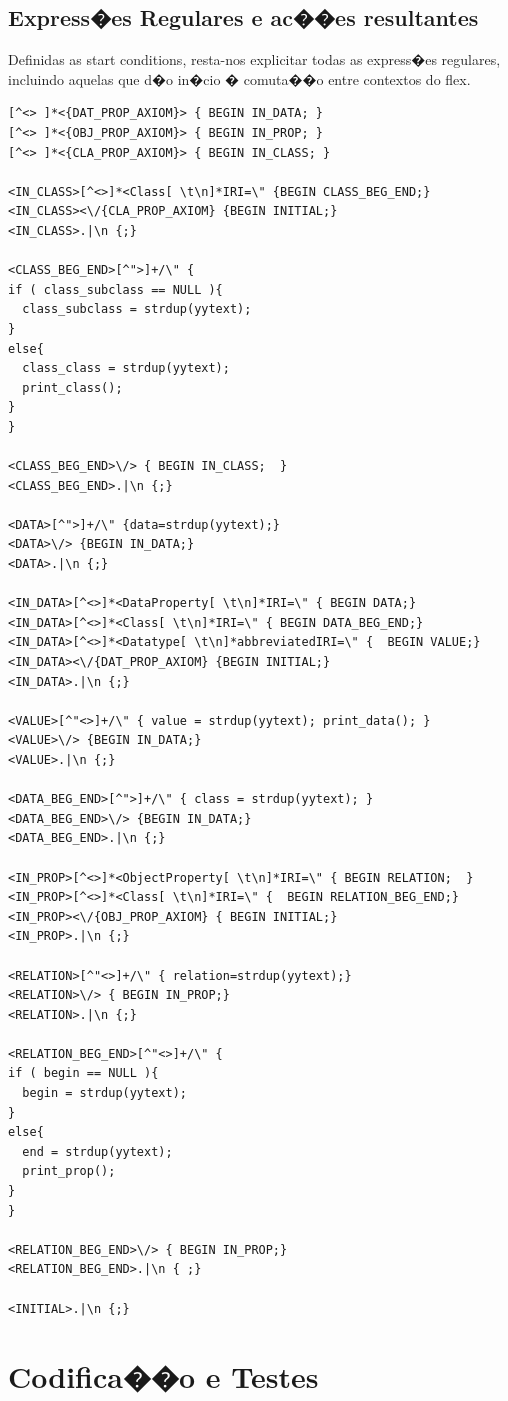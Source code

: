 \documentclass{report}
\begin{document}
\subsection{Express�es Regulares e ac��es resultantes}
\label{1er}
Definidas as start conditions, resta-nos explicitar todas as express�es regulares, incluindo aquelas que d�o in�cio � comuta��o entre contextos do flex.
\begin{lstlisting}
[^<> ]*<{DAT_PROP_AXIOM}> { BEGIN IN_DATA; }
[^<> ]*<{OBJ_PROP_AXIOM}> { BEGIN IN_PROP; }
[^<> ]*<{CLA_PROP_AXIOM}> { BEGIN IN_CLASS; }

<IN_CLASS>[^<>]*<Class[ \t\n]*IRI=\" {BEGIN CLASS_BEG_END;}
<IN_CLASS><\/{CLA_PROP_AXIOM} {BEGIN INITIAL;}
<IN_CLASS>.|\n {;}

<CLASS_BEG_END>[^">]+/\" {
if ( class_subclass == NULL ){
  class_subclass = strdup(yytext);
}
else{
  class_class = strdup(yytext);
  print_class();
} 
}

<CLASS_BEG_END>\/> { BEGIN IN_CLASS;  }
<CLASS_BEG_END>.|\n {;}

<DATA>[^">]+/\" {data=strdup(yytext);} 
<DATA>\/> {BEGIN IN_DATA;}
<DATA>.|\n {;}

<IN_DATA>[^<>]*<DataProperty[ \t\n]*IRI=\" { BEGIN DATA;}
<IN_DATA>[^<>]*<Class[ \t\n]*IRI=\" { BEGIN DATA_BEG_END;}
<IN_DATA>[^<>]*<Datatype[ \t\n]*abbreviatedIRI=\" {  BEGIN VALUE;}
<IN_DATA><\/{DAT_PROP_AXIOM} {BEGIN INITIAL;}
<IN_DATA>.|\n {;}

<VALUE>[^"<>]+/\" { value = strdup(yytext); print_data(); }
<VALUE>\/> {BEGIN IN_DATA;}
<VALUE>.|\n {;}

<DATA_BEG_END>[^">]+/\" { class = strdup(yytext); }
<DATA_BEG_END>\/> {BEGIN IN_DATA;}
<DATA_BEG_END>.|\n {;}

<IN_PROP>[^<>]*<ObjectProperty[ \t\n]*IRI=\" { BEGIN RELATION;  }
<IN_PROP>[^<>]*<Class[ \t\n]*IRI=\" {  BEGIN RELATION_BEG_END;}
<IN_PROP><\/{OBJ_PROP_AXIOM} { BEGIN INITIAL;}
<IN_PROP>.|\n {;}

<RELATION>[^"<>]+/\" { relation=strdup(yytext);} 
<RELATION>\/> { BEGIN IN_PROP;}
<RELATION>.|\n {;}

<RELATION_BEG_END>[^"<>]+/\" {
if ( begin == NULL ){
  begin = strdup(yytext);
}
else{
  end = strdup(yytext);
  print_prop();
} 
}

<RELATION_BEG_END>\/> { BEGIN IN_PROP;}
<RELATION_BEG_END>.|\n { ;}

<INITIAL>.|\n {;}
\end{lstlisting}


\section{Codifica��o e Testes}
\end{document}
